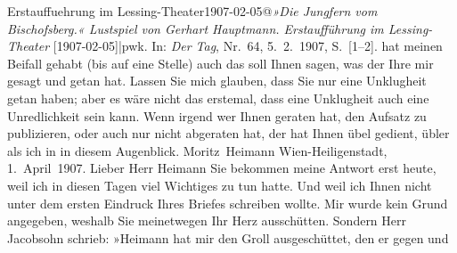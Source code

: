 \begin{ledgroupsized}[t]{13cm}
{{{{                  Erstauffuehrung im Lessing-Theater1907-02-05@\strich\emph{»Die Jungfern vom Bischofsberg.« Lustspiel von Gerhart Hauptmann. Erstaufführung im Lessing-Theater} {[}1907-02-05{]}|pwk}. In: \emph{Der Tag}, Nr. 64, 5. 2. 1907, S. [1–2].}}}\label{K_L03438-7h} hat meinen Beifall gehabt (bis
               auf eine Stelle) auch das soll Ihnen sagen, was der Ihre mir gesagt und getan
               hat.\pend
           \pstart
           Lassen Sie mich glauben, dass Sie nur eine Unklugheit getan haben; aber es wäre nicht
               das erstemal, dass eine Unklugheit auch eine Unredlichkeit sein kann. Wenn irgend wer
               Ihnen geraten hat, den Aufsatz zu publizieren, oder auch nur nicht abgeraten hat, der hat Ihnen
               übel gedient, übler als ich in in diesem Augenblick.\pend
           \pstart \spacefill\mbox{Moritz Heimann}\pend{}{\bigskip}\pstart
           \raggedleft{}{\pb}Wien-Heiligenstadt, 1\label{K_L03438-8v}\label{K_L03438-8h}. April 1907.\pend
           \pstart{}Lieber Herr Heimann\pend\pstart
           Sie bekommen meine Antwort erst heute, weil ich in
               diesen Tagen viel Wichtiges zu tun hatte. Und weil ich Ihnen nicht unter dem ersten
               Eindruck Ihres Briefes schreiben wollte.\pend
           \pstart
           Mir wurde kein Grund angegeben, weshalb Sie meinetwegen Ihr Herz ausschütten. Sondern
               Herr Jacobsohn schrieb: »Heimann hat mir den Groll ausgeschüttet, den er gegen und

\end{ledgroupsized}
